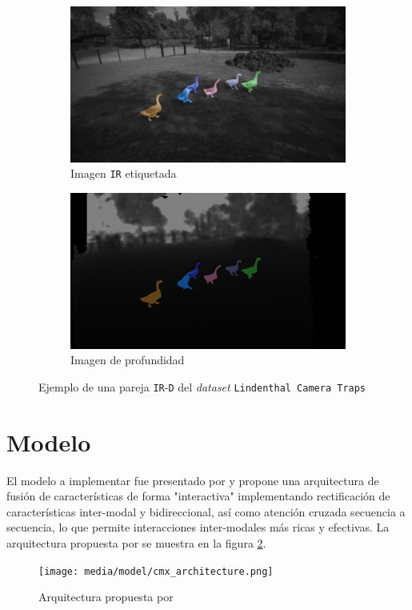 \documentclass[12pt,a4paper]{report}
\begin{document}
\begin{figure}
    \centering
    \begin{subfigure}{0.45\textwidth}
        \centering
        \includegraphics[width=\textwidth]{media/data/mask_gueese_ir.png}
        \caption{Imagen \texttt{IR} etiquetada}
    \end{subfigure}
    \hfill
    \begin{subfigure}{0.45\textwidth}
        \centering
        \includegraphics[width=\textwidth]{media/data/mask_gueese_de.png}
        \caption{Imagen de profundidad}
    \end{subfigure}
    \caption{Ejemplo de una pareja \texttt{IR}-\texttt{D} del \textit{dataset} \texttt{Lindenthal Camera Traps}}
    \label{fig:tagged-example}
\end{figure}

\section{Modelo}
\label{sec:model}
El modelo a implementar fue presentado por \cite{zhang2023cmxcrossmodalfusionrgbx} y propone una arquitectura de fusión de características de forma "interactiva" implementando rectificación de características inter-modal y bidireccional, así como atención cruzada secuencia a secuencia, lo que permite interacciones inter-modales más ricas y efectivas. La arquitectura propuesta por \cite{zhang2023cmxcrossmodalfusionrgbx} se muestra en la figura \ref{fig:cmx-architecture}.
\begin{figure}
    \centering
    \texttt{[image: media/model/cmx\_architecture.png]}
    \caption{Arquitectura propuesta por \cite{zhang2023cmxcrossmodalfusionrgbx}}
    \label{fig:cmx-architecture}
\end{figure}
\end{document}
